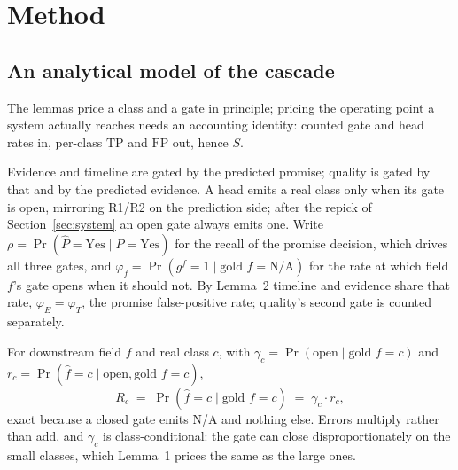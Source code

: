 \section{Method}
\label{sec:method}

\subsection{An analytical model of the cascade}
\label{sec:model}

The lemmas price a class and a gate in principle; pricing the operating point a system actually
reaches needs an accounting identity: counted gate and head rates in, per-class
$\mathrm{TP}$ and $\mathrm{FP}$ out, hence $S$.

 Evidence and timeline are gated by the predicted promise; quality is gated by
that and by the predicted evidence. A head emits a real class only when its gate is open,
mirroring R1/R2 on the prediction side; after the repick of Section~\ref{sec:system} an open gate
always emits one. Write
$\rho=\Pr(\hat{P}{=}\text{Yes}\mid P{=}\text{Yes})$ for the recall of the promise decision, which
drives all three gates, and $\varphi_f=\Pr(g^{f}{=}1\mid\text{gold }f{=}\text{N/A})$ for the rate
at which field $f$'s gate opens when it should not. By Lemma~2 timeline and evidence share that
rate, $\varphi_E{=}\varphi_T$, the promise false-positive rate; quality's second gate is counted
separately.

 For downstream field $f$ and real class $c$, with
$\gamma_c=\Pr(\text{open}\mid\text{gold }f{=}c)$ and
$r_c=\Pr(\hat{f}{=}c\mid\text{open},\text{gold }f{=}c)$,
\begin{equation}
R_c \;=\; \Pr(\hat{f}{=}c\mid\text{gold }f{=}c) \;=\; \gamma_c\cdot r_c,
\label{eq:factor}
\end{equation}
exact because a closed gate emits N/A and nothing else. Errors multiply rather than add, and
$\gamma_c$ is class-conditional: the gate can close disproportionately on the small classes, which
Lemma~1 prices the same as the large ones.

